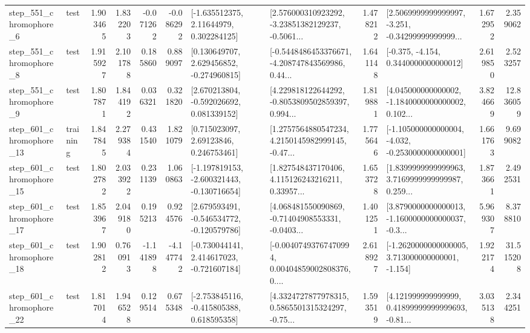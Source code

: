 \begin{tabular}{llrrrrllrlrr}
   step\_551\_chromophore\_6 &      test &      1.903465 &    1.832203 &     -0.071262 & -0.086292 &     [-1.635512375, 2.11644979, 0.302284125] &  [2.576000310923292, -3.23851382129237, -0.5061... &       1.478212 &  [2.5069999999999997, -3.251, -0.34299999999999... &            1.672952 &          2.359062 \\
   step\_551\_chromophore\_8 &      test &      1.915927 &    2.101788 &      0.185860 &  0.889097 &    [0.130649707, 2.629456852, -0.274960815] &  [-0.5448486453376671, -4.208747843569986, 0.44... &       1.641148 &               [-0.375, -4.154, 0.3440000000000012] &            2.619850 &          2.523257 \\
   step\_551\_chromophore\_9 &      test &      1.807871 &    1.844192 &      0.036321 &  0.321820 &    [2.670213804, -0.592026692, 0.081339152] &  [4.229818122644292, -0.8053809502859397, 0.994... &       1.819881 &  [4.045000000000002, -1.1840000000000002, 0.102... &            3.824669 &         12.836059 \\
  step\_601\_chromophore\_13 &  training &      1.847845 &    2.279384 &      0.431540 &  1.821079 &      [0.715023097, 2.69123846, 0.246753461] &  [1.2757564880547234, 4.2150145982999145, -0.47... &       1.775646 &  [-1.105000000000004, -4.032, -0.2530000000000001] &            1.661763 &          9.699082 \\
  step\_601\_chromophore\_15 &      test &      1.802782 &    2.033922 &      0.231139 &  1.060863 &  [-1.197819153, -2.600321443, -0.130716654] &  [1.827548437170406, 4.115126243216211, 0.33957... &       1.653728 &  [1.8399999999999963, 3.7169999999999987, 0.259... &            1.873661 &          2.492531 \\
  step\_601\_chromophore\_17 &      test &      1.853967 &    2.049180 &      0.195213 &  0.924576 &   [2.679593491, -0.546534772, -0.120579786] &  [4.068481550090869, -0.71404908553331, -0.0403... &       1.401251 &  [3.8790000000000013, -1.1600000000000037, -0.3... &            5.969307 &          8.378810 \\
  step\_601\_chromophore\_18 &      test &      1.902812 &    0.760913 &     -1.141898 & -4.147742 &   [-0.730044141, 2.414617023, -0.721607184] &  [-0.00407493767470994, 0.00404859002808376, 0.... &       2.618927 &   [-1.2620000000000005, 3.713000000000001, -1.154] &            1.922174 &         31.515208 \\
  step\_601\_chromophore\_22 &      test &      1.817014 &    1.946528 &      0.129514 &  0.675348 &   [-2.753845116, -0.415805388, 0.618595358] &  [4.3324727877978315, 0.5865501315324297, -0.75... &       1.593519 &  [4.121999999999999, 0.41899999999999693, -0.81... &            3.035138 &          2.344251 \\

\end{tabular}
